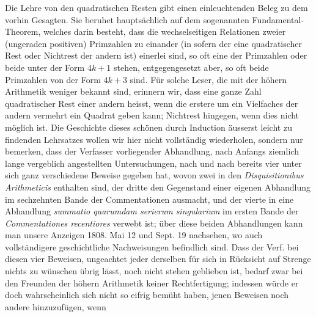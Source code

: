 Die Lehre von den quadratischen Resten gibt einen einleuchtenden Beleg zu dem vorhin Gesagten. Sie beruhet hauptsächlich auf dem sogenannten Fundamental-Theorem, welches darin besteht, dass die wechselseitigen Relationen zweier (ungeraden positiven) Primzahlen zu einander (in sofern der eine quadratischer Rest oder Nichtrest der andern ist) einerlei sind, so oft eine der Primzahlen oder beide unter der Form $4k+1$ stehen, entgegengesetzt aber, so oft beide Primzahlen von der Form $4k+3$ sind. Für solche Leser, die mit der höhern Arithmetik weniger bekannt sind, erinnern wir, dass eine ganze Zahl quadratischer Rest einer andern heisst, wenn die erstere um ein Vielfaches der andern vermehrt ein Quadrat geben kann; Nichtrest hingegen, wenn dies nicht möglich ist. Die Geschichte dieses schönen durch Induction äusserst leicht zu findenden Lehrsatzes wollen wir hier nicht vollständig wiederholen, sondern nur bemerken, dass der Verfasser vorliegender Abhandlung, nach Anfangs ziemlich lange vergeblich angestellten Untersuchungen, nach und nach bereits vier unter sich ganz verschiedene Beweise gegeben hat, wovon zwei in den \emph{Disquisitionibus Arithmeticis} enthalten sind, der dritte den Gegenstand einer eigenen Abhandlung im sechzehnten Bande der Commentationen ausmacht, und der vierte in eine Abhandlung \emph{summatio quarumdam serierum singularium} im ersten Bande der \emph{Commentationes recentiores} verwebt ist; über diese beiden Abhandlungen kann man unsere Anzeigen 1808. Mai 12 und Sept. 19 nachsehen, wo auch vollständigere geschichtliche Nachweisungen befindlich sind. Dass der Verf. bei diesen vier Beweisen, ungeachtet jeder derselben für sich in Rücksicht auf Strenge nichts zu wünschen übrig lässt, noch nicht stehen geblieben ist, bedarf zwar bei den Freunden der höhern Arithmetik keiner Rechtfertigung; indessen würde er doch wahrscheinlich sich nicht so eifrig bemüht haben, jenen Beweisen noch andere hinzuzufügen, wenn
%
